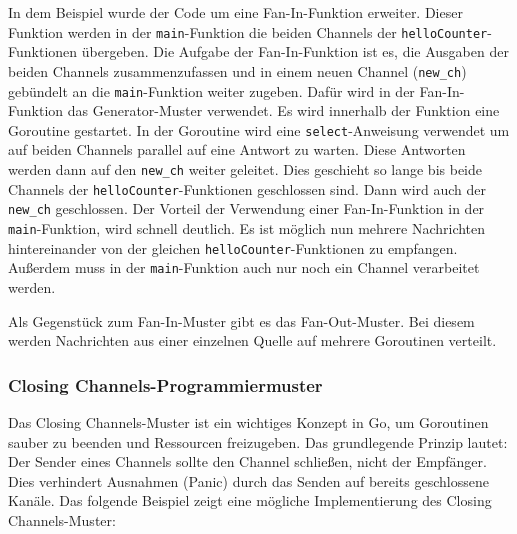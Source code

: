 \documentclass[fontsize=12pt,paper=a4,twoside=semi,parskip=half-,headsepline,headinclude]{scrreprt}
\begin{document}
In dem Beispiel wurde der Code um eine Fan-In-Funktion erweiter. Dieser Funktion werden in der \texttt{main}-Funktion die beiden Channels der \texttt{helloCounter}-Funktionen übergeben. Die Aufgabe der Fan-In-Funktion ist es, die Ausgaben der beiden Channels zusammenzufassen und in einem neuen Channel (\texttt{new\_ch}) gebündelt an die \texttt{main}-Funktion weiter zugeben. Dafür wird in der Fan-In-Funktion das Generator-Muster verwendet. Es wird innerhalb der Funktion eine Goroutine gestartet. In der Goroutine wird eine \texttt{select}-Anweisung verwendet um auf beiden Channels parallel auf eine Antwort zu warten. Diese Antworten werden dann auf den \texttt{new\_ch} weiter geleitet. Dies geschieht so lange bis beide Channels der \texttt{helloCounter}-Funktionen geschlossen sind. Dann wird auch der \texttt{new\_ch} geschlossen. Der Vorteil der Verwendung einer Fan-In-Funktion in der \texttt{main}-Funktion, wird schnell deutlich. Es ist möglich nun mehrere Nachrichten hintereinander von der gleichen \texttt{helloCounter}-Funktionen zu empfangen. Außerdem muss in der \texttt{main}-Funktion auch nur noch ein Channel verarbeitet werden. 

Als Gegenstück zum Fan-In-Muster gibt es das Fan-Out-Muster. Bei diesem werden Nachrichten aus einer einzelnen Quelle auf mehrere Goroutinen verteilt.

\subsubsection{Closing Channels-Programmiermuster}
\label{subsubsec:closingchannel}

Das Closing Channels-Muster ist ein wichtiges Konzept in Go, um Goroutinen sauber zu beenden und Ressourcen freizugeben. Das grundlegende Prinzip lautet: Der Sender eines Channels sollte den Channel schließen, nicht der Empfänger. Dies verhindert Ausnahmen (Panic) durch das Senden auf bereits geschlossene Kanäle. Das folgende Beispiel zeigt eine mögliche Implementierung des Closing Channels-Muster:
\end{document}
